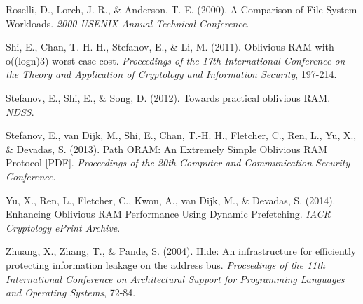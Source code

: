 \documentclass{article}
\begin{document}
\begin{multicols}{2}
\begin{thebibliography}{9}
 Roselli, D., Lorch, J. R., \& Anderson, T. E. (2000). A Comparison of File System Workloads. {\em 2000 USENIX Annual Technical Conference}.

 Shi, E., Chan, T.-H. H., Stefanov, E., \& Li, M. (2011). Oblivious RAM with o((logn)3) worst-case cost. {\em Proceedings of the 17th International Conference on the Theory and Application of Cryptology and Information Security}, 197-214.

 Stefanov, E., Shi, E., \& Song, D. (2012). Towards practical oblivious RAM. {\em NDSS}.

 Stefanov, E., van Dijk, M., Shi, E., Chan, T.-H. H., Fletcher, C., Ren, L., Yu, X., \& Devadas, S. (2013). Path ORAM: An Extremely Simple Oblivious RAM Protocol [PDF]. {\em Proceedings of the 20th Computer and Communication Security Conference}.

 Yu, X., Ren, L., Fletcher, C., Kwon, A., van Dijk, M., \& Devadas, S. (2014). Enhancing Oblivious RAM Performance Using Dynamic Prefetching. {\em IACR Cryptology ePrint Archive}.

 Zhuang, X., Zhang, T., \& Pande, S. (2004). Hide: An infrastructure for efficiently protecting information leakage on the address bus. {\em Proceedings of the 11th International Conference on Architectural Support for Programming Languages and Operating Systems}, 72-84.

\end{thebibliography}

\end{multicols}
\end{document}
